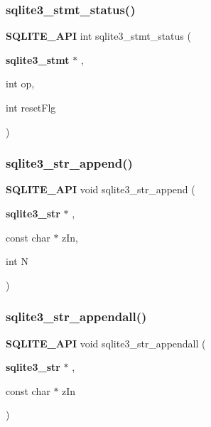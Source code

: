\subsubsection{sqlite3\_stmt\_status()}
{\footnotesize\ttfamily \textbf{ S\+Q\+L\+I\+T\+E\+\_\+\+A\+PI} int sqlite3\+\_\+stmt\+\_\+status (\begin{DoxyParamCaption}\item[{\textbf{ sqlite3\+\_\+stmt} $\ast$}]{,  }\item[{int}]{op,  }\item[{int}]{reset\+Flg }\end{DoxyParamCaption})}

\mbox{\label{sqlite3_8h_ae8104bd5de783db5e41cb4638111032a}} 
\subsubsection{sqlite3\_str\_append()}
{\footnotesize\ttfamily \textbf{ S\+Q\+L\+I\+T\+E\+\_\+\+A\+PI} void sqlite3\+\_\+str\+\_\+append (\begin{DoxyParamCaption}\item[{\textbf{ sqlite3\+\_\+str} $\ast$}]{,  }\item[{const char $\ast$}]{z\+In,  }\item[{int}]{N }\end{DoxyParamCaption})}

\mbox{\label{sqlite3_8h_a6ba0c20e4e277988750dad398db293ac}} 
\subsubsection{sqlite3\_str\_appendall()}
{\footnotesize\ttfamily \textbf{ S\+Q\+L\+I\+T\+E\+\_\+\+A\+PI} void sqlite3\+\_\+str\+\_\+appendall (\begin{DoxyParamCaption}\item[{\textbf{ sqlite3\+\_\+str} $\ast$}]{,  }\item[{const char $\ast$}]{z\+In }\end{DoxyParamCaption})}

\mbox{\label{sqlite3_8h_a8655fcbccb9c9e274a0064af1e791f67}} 
